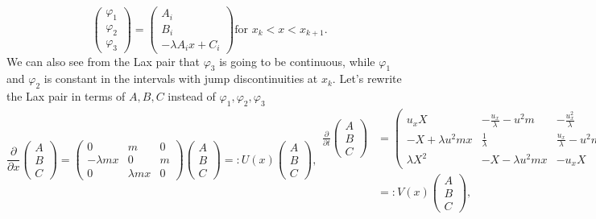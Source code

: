 \documentclass[english,master]{liumaiex}
\theoremstyle{plain}
\theoremstyle{definition}
\begin{document}
\begin{equation}
\begin{pmatrix} \varphi_1 \\ \varphi_2 \\ \varphi_3 \end{pmatrix} =
\begin{pmatrix} A_i \\ B_i \\ -\lambda A_i x + C_i \end{pmatrix} 
\text{for } x_k < x < x_{k+1}.
\end{equation}
We can also see from the Lax pair that $\varphi_3$ is going to be continuous, while $\varphi_1$ and $\varphi_2$ is constant in the intervals with jump discontinuities at $x_k$. Let's rewrite the Lax pair in terms of $A, B, C$ instead of $\varphi_1, \varphi_2, \varphi_3$
\begin{subequations}
  \begin{equation}
    \frac{\partial}{\partial x}
    \begin{pmatrix} A \\ B \\ C \end{pmatrix} =
    \begin{pmatrix}
      0 & m & 0 \\
      -\lambda m x & 0 & m \\
      0 & \lambda m x & 0
    \end{pmatrix}
    \begin{pmatrix} A \\ B \\ C \end{pmatrix}
	=: U(x) \begin{pmatrix} A \\ B \\ C \end{pmatrix}
    ,
  \end{equation}
  \begin{align}
    \frac{\partial}{\partial t}
    \begin{pmatrix} A \\ B \\ C \end{pmatrix} &=
    \begin{pmatrix}
      u_x X & -\frac{u_x}{\lambda} -u^2 m & -\frac{u_x^2}{\lambda} \\
      -X + \lambda u^2 m x & \frac{1}{\lambda} & \frac{u_x}{\lambda} - u^2 m \\
      \lambda X^2 & -X - \lambda u^2 m x & -u_x X
    \end{pmatrix}
    \begin{pmatrix} A \\ B \\ C \end{pmatrix} \\
	&=: V(x) \begin{pmatrix} A \\ B \\ C \end{pmatrix}
    ,
  \end{align}
\end{subequations}
\end{document}
